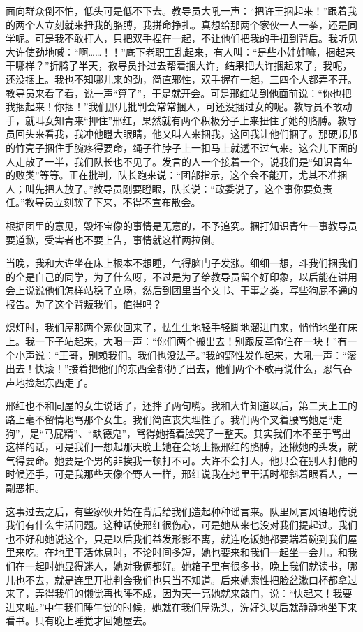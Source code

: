 面向群众倒不怕，低头可是低不下去。教导员大吼一声：“把许王捆起来！”跟着我的两个人立刻就来扭我的胳膊，我拼命挣扎。真想给那两个家伙一人一拳，还是同学呢。可是我不敢打人，只把双手捏在一起，不让他们把我的手扭到背后。我听见大许使劲地喊：“啊……！！”底下老职工乱起来，有人叫：“是些小娃娃嘛，捆起来干哪样？”折腾了半天，教导员扑过去帮着捆大许，结果把大许捆起来了，我呢，还没捆上。我也不知哪儿来的劲，简直邪性，双手握在一起，三四个人都弄不开。教导员来看了看，说一声“算了”，于是就开会。可是邢红站到他面前说：“你也把我捆起来！你捆！”我们那儿批判会常常捆人，可还没捆过女的呢。教导员不敢动手，就叫女知青来“押住”邢红，果然就有两个积极分子上来扭住了她的胳膊。教导员回头来看我，我冲他瞪大眼睛，他又叫人来捆我，这回我让他们捆了。那硬邦邦的竹壳子捆住手腕疼得要命，绳子往脖子上一扣马上就透不过气来。这会儿下面的人走散了一半，我们队长也不见了。发言的人一个接着一个，说我们是“知识青年的败类”等等。正在批判，队长跑来说：“团部指示，这个会不能开，尤其不准捆人；叫先把人放了。”教导员刚要瞪眼，队长说：“政委说了，这个事你要负责任。”教导员立刻软了下来，不得不宣布散会。 

根据团里的意见，毁坏宝像的事情是无意的，不予追究。捆打知识青年一事教导员要道歉，受害者也不要上告，事情就这样两拉倒。 

当晚，我和大许坐在床上根本不想睡，气得脑门子发涨。细细一想，斗我们捆我们的全是自己的同学，为了什么呀，不过是为了给教导员留个好印象，以后能在讲用会上说说他们怎样站稳了立场，然后到团里当个文书、干事之类，写些狗屁不通的报告。为了这个背叛我们，值得吗？ 

熄灯时，我们屋那两个家伙回来了，怯生生地轻手轻脚地溜进门来，悄悄地坐在床上。我一下子站起来，大喝一声：“你们两个搬出去！别跟反革命住在一块！”有一个小声说：“王哥，别赖我们。我们也没法子。”我的野性发作起来，大吼一声：“滚出去！快滚！”接着把他们的东西全都扔了出去，他们两个不敢再说什么，忍气吞声地捡起东西走了。 

邢红也不和同屋的女生说话了，还拌了两句嘴。我和大许知道以后，第二天上工的路上毫不留情地骂那个女生。我们简直丧失理性了。我们两个叉着腰骂她是“走狗”，是“马屁精”、“缺德鬼”，骂得她捂着脸哭了一整天。其实我们本不至于骂出这样的话，可是我们一想起那天晚上她在会场上撅邢红的胳膊，还揪她的头发，就气得要命。她要是个男的非挨我一顿打不可。大许不会打人，他只会在别人打他的时候还手，可是我那些天像个野人一样，邢红说我在地里干活时都斜着眼看人，一副恶相。 

这事过去之后，有些家伙开始在背后给我们造起种种谣言来。队里风言风语地传说我们有什么生活问题。这种话使邢红很伤心，可是她从来也没对我们提起过。我们也不好和她说这个，只是以后我们益发形影不离，就连吃饭她都要端着碗到我们屋里来吃。在地里干活休息时，不论时间多短，她也要来和我们一起坐一会儿。和我们在一起时她显得迷人，她对我俩都好。她箱子里有很多书，晚上我们就读书，哪儿也不去，就是连里开批判会我们也只当不知道。后来她索性把脸盆漱口杯都拿过来了，弄得我们的懒觉再也睡不成，因为天一亮她就来敲门，说：“快起来！我要进来啦。”中午我们睡午觉的时候，她就在我们屋洗头，洗好头以后就静静地坐下来看书。只有晚上睡觉才回她屋去。 

